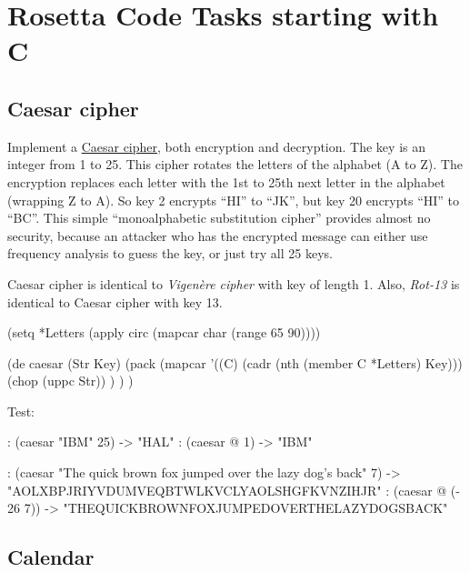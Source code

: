 %
%
%

\chapter{Rosetta Code Tasks starting with C}


\section*{Caesar cipher}

Implement a \href{http://en.wikipedia.org/wiki/Caesar\_cipher}{Caesar
cipher}, both encryption and decryption. The key is an integer from 1 to
25. This cipher rotates the letters of the alphabet (A to Z). The
encryption replaces each letter with the 1st to 25th next letter in the
alphabet (wrapping Z to A). So key 2 encrypts ``HI'' to ``JK'', but key
20 encrypts ``HI'' to ``BC''. This simple ``monoalphabetic substitution
cipher'' provides almost no security, because an attacker who has the
encrypted message can either use frequency analysis to guess the key, or
just try all 25 keys.

Caesar cipher is identical to \emph{Vigenère cipher} with key of
length 1. Also, \emph{Rot-13} is identical to Caesar cipher with key
13.

\begin{wideverbatim}

(setq *Letters (apply circ (mapcar char (range 65 90))))

(de caesar (Str Key)
   (pack
      (mapcar '((C) (cadr (nth (member C *Letters) Key)))
         (chop (uppc Str)) ) ) )

Test:

: (caesar "IBM" 25)
-> "HAL"
: (caesar @ 1)
-> "IBM"

: (caesar "The quick brown fox jumped over the lazy dog's back" 7)
-> "AOLXBPJRIYVDUMVEQBTWLKVCLYAOLSHGFKVNZIHJR"
: (caesar @ (- 26 7))
-> "THEQUICKBROWNFOXJUMPEDOVERTHELAZYDOGSBACK"

\end{wideverbatim}

\pagebreak{}
\section*{Calendar}


